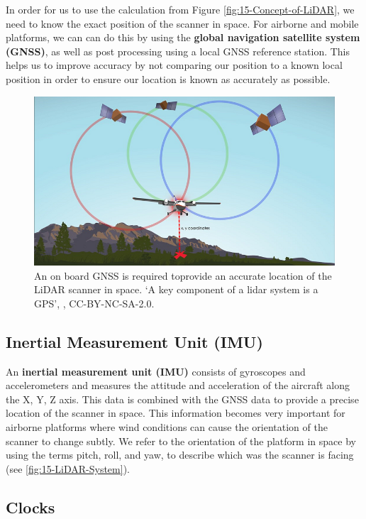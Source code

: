 \documentclass[
]{book}
\begin{document}
In order for us to use the calculation from Figure \ref{fig:15-Concept-of-LiDAR}, we need to know the exact position of the scanner in space. For airborne and mobile platforms, we can can do this by using the \textbf{global navigation satellite system (GNSS)}, as well as post processing using a local GNSS reference station. This helps us to improve accuracy by not comparing our position to a known local position in order to ensure our location is known as accurately as possible.



\begin{figure}
\includegraphics[width=0.75\linewidth]{images/15-XYZ-coordinates} \caption{An on board GNSS is required toprovide an accurate location of the LiDAR scanner in space. `A key component of a lidar system is a GPS', \citep{neon_education_key_2014}, CC-BY-NC-SA-2.0.}\label{fig:15-XYZ-coordinates}
\end{figure}

\subsection{Inertial Measurement Unit (IMU)}\label{inertial-measurement-unit-imu}

An \textbf{inertial measurement unit (IMU)} consists of gyroscopes and accelerometers and measures the attitude and acceleration of the aircraft along the X, Y, Z axis. This data is combined with the GNSS data to provide a precise location of the scanner in space. This information becomes very important for airborne platforms where wind conditions can cause the orientation of the scanner to change subtly. We refer to the orientation of the platform in space by using the terms pitch, roll, and yaw, to describe which was the scanner is facing (see \ref{fig:15-LiDAR-System}).

\subsection{Clocks}\label{clocks}
\end{document}
